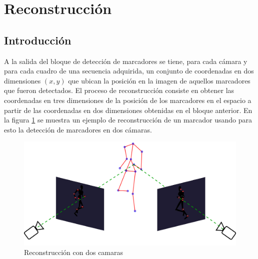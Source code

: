 


\section{Reconstrucción}
\subsection{Introducción}
A la salida del bloque de detección de marcadores se tiene, para cada cámara y para cada cuadro de una secuencia adquirida, un conjunto de coordenadas en dos dimensiones $(x,y)$ que ubican la posición en la imagen de aquellos marcadores que fueron detectados.
El proceso de reconstrucción consiste en obtener las coordenadas en tres dimensiones de la posición de los marcadores en el espacio a partir de las coordenadas en dos dimensiones obtenidas en el bloque anterior.
En la figura \ref{fig: esquema_reconstruccion} se muestra un ejemplo de reconstrucción de un marcador usando para esto la detección de marcadores en dos cámaras.\\

\begin{figure}[!ht]
\begin{center}
\includegraphics[scale=0.20]{img/Reconstruccion/reconstruccion}

\end{center}
\caption{Reconstrucción con dos camaras}
\label{fig: esquema_reconstruccion}
\end{figure}

